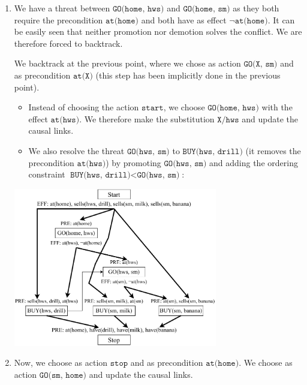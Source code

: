 \begin{example}
\begin{enumerate}
        \item We have a threat between $\texttt{GO(home, hws)}$ and $\texttt{GO(home, sm)}$ as they both
            require the precondition $\texttt{at(home)}$ and both have as effect $\lnot\texttt{at(home)}$.
            It can be easily seen that neither promotion nor demotion solves the conflict. 
            We are therefore forced to backtrack.

            We backtrack at the previous point, where we chose as action $\texttt{GO(X, sm)}$ and as precondition $\texttt{at(X)}$
            (this step has been implicitly done in the previous point).
            \begin{itemize}
                \item Instead of choosing the action $\texttt{start}$, we choose $\texttt{GO(home, hws)}$ with the effect $\texttt{at(hws)}$.
                    We therefore make the substitution $\texttt{X}/\texttt{hws}$ and update the causal links.
                \item We also resolve the threat $\texttt{GO(hws, sm)}$ to $\texttt{BUY(hws, drill)}$
                    (it removes the precondition $\texttt{at(hws)}$)
                    by promoting $\texttt{GO(hws, sm)}$
                    and adding the ordering constraint $\texttt{BUY(hws, drill)} < \texttt{GO(hws, sm)}$:
            \end{itemize}
            \begin{center}
                \includegraphics[width=0.7\textwidth]{img/_pop_example6.pdf}
            \end{center}

        \item Now, we choose as action $\texttt{stop}$ and as precondition $\texttt{at(home)}$.
            We choose as action $\texttt{GO(sm, home)}$ and update the causal links.
            

\end{enumerate}
\end{example}

